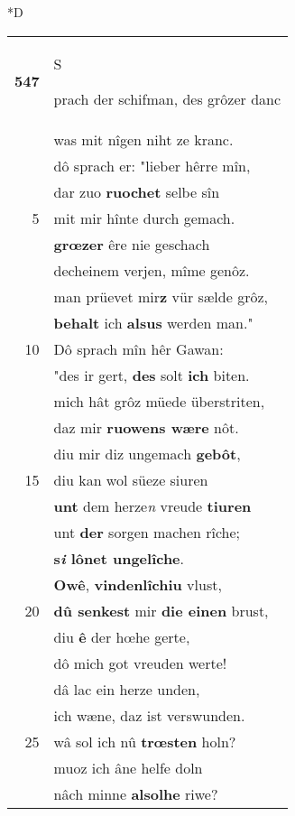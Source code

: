 \documentclass[8pt,a4paper,notitlepage]{article}
\begin{document}
\begin{table}[ht]
\begin{minipage}[t]{0.5\linewidth}
\small
\begin{center}*D
\end{center}
\begin{tabular}{rl}
\textbf{547} & \begin{large}S\end{large}prach der schifman, des grôzer danc\\ 
 & was mit nîgen niht ze kranc.\\ 
 & dô sprach er: "lieber hêrre mîn,\\ 
 & dar zuo \textbf{ruochet} selbe sîn\\ 
5 & mit mir hînte durch gemach.\\ 
 & \textbf{grœzer} êre nie geschach\\ 
 & decheinem verjen, mîme genôz.\\ 
 & man prüevet mir\textbf{z} vür sælde grôz,\\ 
 & \textbf{behalt} ich \textbf{alsus} werden man."\\ 
10 & Dô sprach mîn hêr Gawan:\\ 
 & "des ir gert, \textbf{des} solt \textbf{ich} biten.\\ 
 & mich hât grôz müede überstriten,\\ 
 & daz mir \textbf{ruowens wære} nôt.\\ 
 & diu mir diz ungemach \textbf{gebôt},\\ 
15 & diu kan wol süeze siuren\\ 
 & \textbf{unt} dem herze\textit{n} vreude \textbf{tiuren}\\ 
 & unt \textbf{der} sorgen machen rîche;\\ 
 & \textbf{s\textit{i} lônet ungelîche}.\\ 
 & \textbf{Owê}, \textbf{vindenlîchiu} vlust,\\ 
20 & \textbf{dû senkest} mir \textbf{die einen} brust,\\ 
 & diu \textbf{ê} der hœhe gerte,\\ 
 & dô mich got vreuden werte!\\ 
 & dâ lac ein herze unden,\\ 
 & ich wæne, daz ist verswunden.\\ 
25 & wâ sol ich nû \textbf{trœsten} holn?\\ 
 & muoz ich âne helfe doln\\ 
 & nâch minne \textbf{alsolhe} riwe?\\ 

\end{tabular}
\end{minipage}
\end{table}
\end{document}
